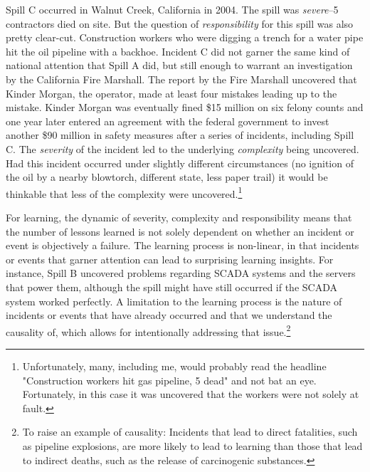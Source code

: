 \documentclass[12pt, man, natbib]{apa6}
\begin{document}
	Spill C occurred in Walnut Creek, California in 2004. The spill was \textit{severe}--5 contractors died on site. But the question of \textit{responsibility} for this spill was also pretty clear-cut. Construction workers who were digging a trench for a water pipe hit the oil pipeline with a backhoe. Incident C did not garner the same kind of national attention that Spill A did, but still enough to warrant an investigation by the California Fire Marshall. The report by the Fire Marshall uncovered that Kinder Morgan, the operator, made at least four mistakes leading up to the mistake. Kinder Morgan was eventually fined \$15 million on six felony counts and one year later entered an agreement with the federal government to invest another \$90 million in safety measures after a series of incidents, including Spill C. The \textit{severity} of the incident led to the underlying \textit{complexity} being uncovered. Had this incident occurred under slightly different circumstances (no ignition of the oil by a nearby blowtorch, different state, less paper trail) it would be thinkable that less of the complexity were uncovered.\footnote{Unfortunately, many, including me, would probably read the headline "Construction workers hit gas pipeline, 5 dead" and not bat an eye. Fortunately, in this case it was uncovered that the workers were not solely at fault.}	
	
	For learning, the dynamic of severity, complexity and responsibility means that the number of lessons learned is not solely dependent on whether an incident or event is objectively a failure. The learning process is non-linear, in that incidents or events that garner attention can lead to surprising learning insights. For instance, Spill B uncovered problems regarding SCADA systems and the servers that power them, although the spill might have still occurred if the SCADA system worked perfectly. A limitation to the learning process is the nature of incidents or events that have already occurred and that we understand the causality of, which allows for intentionally addressing that issue.\footnote{To raise an example of causality: Incidents that lead to direct fatalities, such as pipeline explosions, are more likely to lead to learning than those that lead to indirect deaths, such as the release of carcinogenic substances.}
	
\end{document}
